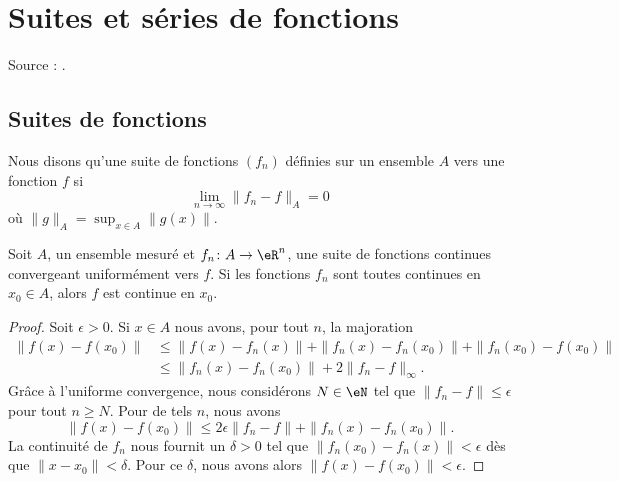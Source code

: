 \section{Suites et séries de fonctions}
Source : \cite{TrenchRealAnalisys}.

\subsection{Suites de fonctions}

\begin{definition}
    Nous disons qu'une suite de fonctions \( (f_n)\) définies sur un ensemble \( A\)  vers une fonction \( f\) si
    \begin{equation}
        \lim_{n\to \infty} \| f_n-f \|_A=0
    \end{equation}
    où \( \| g \|_A=\sup_{x\in A}\| g(x) \|\).
\end{definition}

\begin{theorem}			\label{ThoUnigCvCont}
    Soit \( A\), un ensemble mesuré et \( f_n\colon A\to \eR^n\), une suite de fonctions continues convergeant uniformément vers \( f\). Si les fonctions \( f_n\) sont toutes continues en \( x_0\in A\), alors \( f\) est continue en \( x_0\).
\end{theorem}

\begin{proof}
    Soit \( \epsilon>0\). Si \( x\in A\) nous avons, pour tout \( n\), la majoration
    \begin{subequations}
        \begin{align}
            \| f(x)-f(x_0) \|&\leq \| f(x)-f_n(x) \|+\| f_n(x)-f_n(x_0) \|+\| f_n(x_0)-f(x_0) \|\\
            &\leq\| f_n(x)-f_n(x_0) \|+2\| f_n-f \|_{\infty}.
        \end{align}
    \end{subequations}
    Grâce à l'uniforme convergence, nous considérons \(N\in \eN\) tel que \( \| f_n-f \|\leq \epsilon\) pour tout \( n\geq N\). Pour de tels \( n\), nous avons
    \begin{equation}
        \| f(x)-f(x_0) \|\leq 2\epsilon\| f_n-f \|+\| f_n(x)-f_n(x_0) \|.
    \end{equation}
    La continuité de \( f_n\) nous fournit un \( \delta>0\) tel que \( \| f_n(x_0)-f_n(x) \|<\epsilon\) dès que \( \| x-x_0 \|<\delta\). Pour ce \( \delta\), nous avons alors \( \| f(x)-f(x_0) \|<\epsilon\).
\end{proof}

